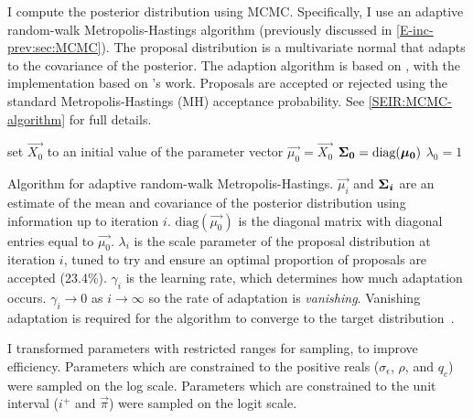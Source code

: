 \documentclass[thesis.tex]{subfiles}
\begin{document}
I compute the posterior distribution using MCMC.
Specifically, I use an adaptive random-walk Metropolis-Hastings algorithm (previously discussed in \cref{E-inc-prev:sec:MCMC}).
The proposal distribution is a multivariate normal that adapts to the covariance of the posterior.
The adaption algorithm is based on \textcite[algorithm 4]{andrieuTutorial}, with the implementation based on \textcite{ghoshApproximate}'s work.
Proposals are accepted or rejected using the standard Metropolis-Hastings (MH) acceptance probability.
See \cref{SEIR:MCMC-algorithm} for full details.
\begin{algorithm}
 set $\vec{X_0}$ to an initial value of the parameter vector \;
 $\vec{\mu_0} = \vec{X_0}$ \;
 $\bm{\Sigma_0} = \text{diag}(\bm{\mu_0})$ \;
 $\lambda_0 = 1$ \;
 \caption{Algorithm for adaptive random-walk Metropolis-Hastings. $\vec{\mu_i}$ and $\bm{\Sigma_i}$ are an estimate of the mean and covariance of the posterior distribution using information up to iteration $i$. $\text{diag}(\vec{\mu_0})$ is the diagonal matrix with diagonal entries equal to $\vec{\mu_0}$. $\lambda_i$ is the scale parameter of the proposal distribution at iteration $i$, tuned to try and ensure an optimal proportion of proposals are accepted (23.4\%). $\gamma_i$ is the learning rate, which determines how much adaptation occurs. $\gamma_i \to 0$ as $i \to \infty$ so the rate of adaptation is \emph{vanishing}. Vanishing adaptation is required for the algorithm to converge to the target distribution~\autocite[section 3]{andrieuTutorial}.}
 \label{SEIR:MCMC-algorithm}
\end{algorithm}

I transformed parameters with restricted ranges for sampling, to improve efficiency.
Parameters which are constrained to the positive reals ($\sigma_\epsilon$, $\rho$, and $q_c$) were sampled on the log scale.
Parameters which are constrained to the unit interval ($i^+$ and $\vec{\pi}$) were sampled on the logit scale.
\end{document}
